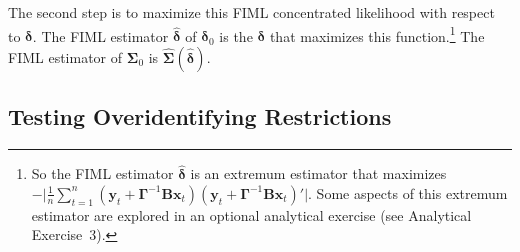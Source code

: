 The second step is to maximize this FIML concentrated likelihood with respect to
$\boldsymbol{\delta}$. The FIML estimator $\hat{\boldsymbol{\delta}}$ of $\boldsymbol{\delta}_0$ is the $\boldsymbol{\delta}$ that maximizes this function.\footnote{So the FIML estimator $\hat{\boldsymbol{\delta}}$ is an extremum estimator that maximizes
$-\bigl|\frac{1}{n}\sum_{t=1}^{n}
(\mathbf{y}_t + \boldsymbol{\Gamma}^{-1}\mathbf{B}\mathbf{x}_t)
(\mathbf{y}_t + \boldsymbol{\Gamma}^{-1}\mathbf{B}\mathbf{x}_t)'\bigr|$.
Some aspects of this extremum estimator are explored in an optional analytical exercise (see Analytical Exercise~3).}
The FIML
estimator of $\boldsymbol{\Sigma}_0$ is $\hat{\boldsymbol{\Sigma}}(\hat{\boldsymbol{\delta}})$.

\subsection*{Testing Overidentifying Restrictions}

